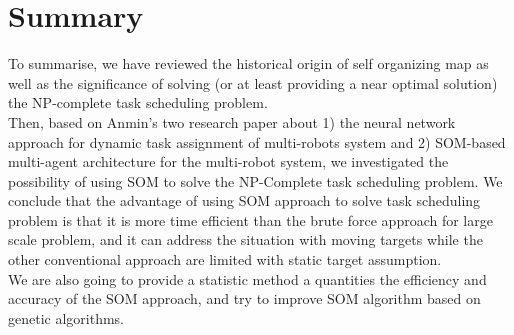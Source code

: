 \chapter{Summary}
To summarise, we have reviewed the historical origin of self organizing map as well as the significance of solving (or at least providing a near optimal solution) the NP-complete task scheduling problem. 
\\
Then, based on Anmin's two research paper about 1) the neural network approach for dynamic task assignment of multi-robots system and 2) SOM-based multi-agent architecture for the multi-robot system, we investigated the possibility of using SOM to solve the NP-Complete task scheduling problem. We conclude that the advantage of using SOM approach to solve task scheduling problem is that it is more time efficient than the brute force approach for large scale problem, and it can address the situation with moving targets while the other conventional approach are limited with static target assumption.
\\We are also going to provide a statistic method a quantities the efficiency and accuracy of the SOM approach, and try to improve SOM algorithm based on genetic algorithms. 


